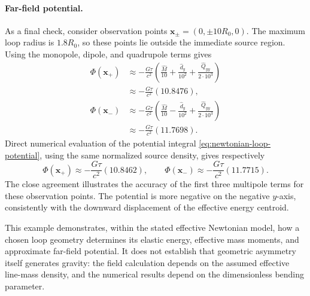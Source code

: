 \documentclass{article}
\numberwithin{tm}{section}
\numberwithin{dn}{section}
\numberwithin{as}{section}
\numberwithin{rk}{section}
\numberwithin{lem}{section}
\numberwithin{ax}{section}
\numberwithin{pp}{section}
\numberwithin{eg}{section}
\numberwithin{war}{section}
\numberwithin{equation}{section}
\numberwithin{prop}{section}
\numberwithin{nt}{section}
\numberwithin{rc}{section}
\begin{document}
\paragraph{Far-field potential.}
As a final check, consider observation points
\(\mathbf{x}_{\pm}=(0,\pm10R_0,0)\). The maximum loop radius is
\(1.8R_0\), so these points lie outside the immediate source
region. Using the monopole, dipole, and quadrupole terms gives
\[
\begin{aligned}
	\Phi(\mathbf{x}_+)
	&\approx
	-\frac{G\tau}{c^2}
	\left(
	\frac{\widehat{M}}{10}
	+\frac{\widehat{d}_y}{10^2}
	+\frac{\widehat{Q}_{yy}}{2\cdot10^3}
	\right)\\
	&\approx
	-\frac{G\tau}{c^2}(10.8476),
	\\[6pt]
	\Phi(\mathbf{x}_-)
	&\approx
	-\frac{G\tau}{c^2}
	\left(
	\frac{\widehat{M}}{10}
	-\frac{\widehat{d}_y}{10^2}
	+\frac{\widehat{Q}_{yy}}{2\cdot10^3}
	\right)\\
	&\approx
	-\frac{G\tau}{c^2}(11.7698).
\end{aligned}
\]
Direct numerical evaluation of the potential integral
\eqref{eq:newtonian-loop-potential}, using the same normalized
source density, gives respectively
\[
\Phi(\mathbf{x}_+)
\approx-\frac{G\tau}{c^2}(10.8462),
\qquad
\Phi(\mathbf{x}_-)
\approx-\frac{G\tau}{c^2}(11.7715).
\]
The close agreement illustrates the accuracy of the first three
multipole terms for these observation points. The potential is
more negative on the negative \(y\)-axis, consistently with the
downward displacement of the effective energy centroid.

This example demonstrates, within the stated effective Newtonian
model, how a chosen loop geometry determines its elastic energy,
effective mass moments, and approximate far-field potential.
It does not establish that geometric asymmetry itself generates
gravity: the field calculation depends on the assumed effective
line-mass density, and the numerical results depend on the
dimensionless bending parameter.
\end{document}
